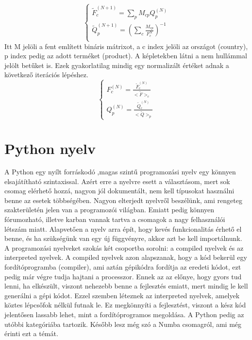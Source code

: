 \documentclass{article}
\theoremstyle{definition}
\theoremstyle{theorem}
\begin{document}
\begin{equation*}
    \begin{cases}
    \widetilde{F}_{c}^{(N + 1)} = \sum_{p} M_{cp} Q_{p}^{(N)} \\
    \widetilde{Q}_{p}^{(N+1)} = (\sum_{c} \frac{M_{cp}}{F_c^N})^{-1} \\

    \end{cases}
\end{equation*}
Itt M jelöli a fent említett bináris mátrixot, a c index jelöli az országot (country), p index pedig az adott terméket (product). A képletekben látni a nem hullámmal jelölt betűket is. Ezek gyakorlatilag mindig egy normalizált értéket adnak a következő iterációs lépéshez.
\begin{equation*}
    \begin{cases}
    F_c^{(N)} = \frac{\widetilde{F}_{c}^{(N)}}{<\widetilde{F}>_c} \\
    Q_p^{(N)} = \frac{\widetilde{Q}_{c}^{(N)}}{<\widetilde{Q}>_p}
    \end{cases}
\end{equation*}


\section{Python nyelv}

A Python egy nyílt forráskodó ,magas szintű programozási nyelv egy könnyen elsajátítható szintaxissal. Azért erre a nyelvre esett
a választásom, mert sok csomag elérhető hozzá, nagyon jól dokumentált, nem kell típusokat használni benne az
esetek többségében. Nagyon elterjedt nyelvről beszélünk, ami rengeteg szakterületén jelen van a programozói világban. Emiatt pedig könnyen fórumozható, illetve karban vannak tartva a csomagok a nagy felhasználói létszám miatt. Alapvetően a nyelv arra épít, hogy kevés funkcionalitás érhető el benne, és ha szükségünk van egy új függvényre, akkor azt be kell importálnunk. A programozási nyelveket szokás két csoportba sorolni: a compiled nyelvek és az interpreted nyelvek. A compiled nyelvek azon alapszanak, hogy a kód bekerül egy fordítóprogramba (compiler), ami aztán gépikódra fordítja az eredeti kódot, ezt pedig már végre tudja hajtani a processzor. Ennek az az előnye, hogy gyors tud lenni, ha elkészült, viszont nehezebb benne a fejlesztés emiatt, mert mindig le kell generálni a gépi kódot. Ezzel szemben léteznek az interpreted nyelvek, amelyek köztes lépcsőfok nélkül futnak le. Ez megkönnyíti a fejlesztést, viszont a kész kód jelentősen lassabb lehet, mint a fordítóprogramos megoldása. A Python pedig az utóbbi kategóriába tartozik. Később lesz még szó a Numba csomagról, ami még érinti ezt a témát.
\end{document}
